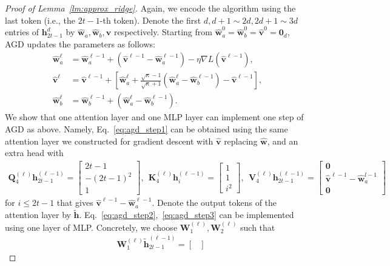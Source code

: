 \documentclass[10pt]{article}
\renewcommand{\hat}{\widehat}
\newcommand{\<}{\left\langle}
\renewcommand{\>}{\right\rangle}
\renewcommand{\bQ}{\mathbf{Q}}
\newcommand{\lth}{{(\ell)}}
\newcommand{\bzero}{{\mathbf 0}}
\newcommand{\partd}{{d}}
\def\bK{{\mathbf K}}
\def\bQ{{\mathbf Q}}
\def\bV{{\mathbf V}}
\def\bW{{\mathbf W}}
\def\bh{{\mathbf h}}
\def\bv{{\mathbf v}}
\def\bw{{\mathbf w}}
\begin{document}
\begin{proof}[Proof of Lemma~\ref{lm:approx_ridge}]
Again, we encode the algorithm using the last token (i.e., the $2t-1$-th token). 
Denote the first $d,d+1\sim 2d, 2d+1\sim3d $ entries of $\bh_{2t-1}^{\partd}$ by $\hat\bw_a,\hat\bw_b,\hat\bv$ respectively. Starting from $\hat\bw_a^{0}=\hat\bw_b^{0}=\hat\bv^{0}=\bzero_d$,  AGD updates the parameters as follows:
\begin{subequations}
\begin{align}
    \hat\bw^\ell_a&=\hat\bw_a^{\ell-1}+(\hat\bv^{\ell-1}-\hat\bw_a^{\ell-1})-\eta \nabla L(\hat\bv^{\ell-1}),\label{eq:agd_step1}\\
    \hat\bv^{\ell}&=\hat\bv^{\ell-1}+[\hat\bw^\ell_a+\frac{\sqrt{\kappa}-1}{\sqrt{\kappa}+1}(\hat\bw^\ell_a-\hat\bw^{\ell-1}_b)-\hat\bv^{\ell-1}],\label{eq:agd_step2}\\
    \hat\bw^\ell_b&= \hat\bw^{\ell-1}_b+( \hat\bw^\ell_a-\hat\bw^{\ell-1}_b).\label{eq:agd_step3}
\end{align}
\end{subequations}
We show that one attention layer and one MLP layer can implement one step of AGD as above. Namely, Eq.~\eqref{eq:agd_step1} can be obtained using the same attention layer we constructed for gradient descent with $\hat\bv$ replacing $\hat\bw$, and an extra head with
\begin{align*}
     \bQ_4^{(\ell)}\bh^{(\ell-1)}_{2t-1}=\begin{bmatrix}
         2t-1\\-(2t-1)^2\\ 1
    \end{bmatrix},~~ \bK_4^{(\ell)}\bh^{(\ell-1)}_{i}=\begin{bmatrix}
        1\\ 1 \\i^2
    \end{bmatrix},~~ \bV_4^{(\ell)}\bh^{(\ell-1)}_{2t-1}=\begin{bmatrix}
        \bzero\\ \hat\bv^{\ell-1}-\hat\bw_a^{l-1}\\ \bzero
    \end{bmatrix}
\end{align*} for $i\leq 2t-1$ that gives $\hat\bv^{\ell-1}-\hat\bw_a^{\ell-1}$.
Denote the output tokens of the attention layer by $\tilde \bh$. Eq.~\eqref{eq:agd_step2},~\eqref{eq:agd_step3} can be implemented using one layer of MLP. Concretely, we choose $\bW_{1}^\lth,\bW_{2}^\lth$ such that
\begin{align*}
     &\bW_1^{(\ell)}\tilde\bh^{(\ell-1)}_{2t-1}=\begin{bmatrix}

\end{bmatrix}
\end{align*}
\end{proof}
\end{document}
